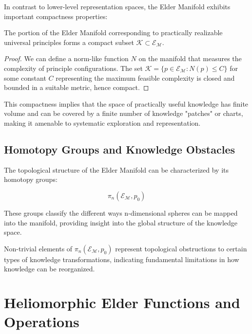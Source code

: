 In contrast to lower-level representation spaces, the Elder Manifold exhibits important compactness properties:

\begin{theorem}
The portion of the Elder Manifold corresponding to practically realizable universal principles forms a compact subset $\mathcal{K} \subset \mathcal{E}_{\mathcal{M}}$.
\end{theorem}

\begin{proof}
We can define a norm-like function $N$ on the manifold that measures the complexity of principle configurations. The set $\mathcal{K} = \{p \in \mathcal{E}_{\mathcal{M}} : N(p) \leq C\}$ for some constant $C$ representing the maximum feasible complexity is closed and bounded in a suitable metric, hence compact.
\end{proof}

This compactness implies that the space of practically useful knowledge has finite volume and can be covered by a finite number of knowledge "patches" or charts, making it amenable to systematic exploration and representation.

\subsection{Homotopy Groups and Knowledge Obstacles}

The topological structure of the Elder Manifold can be characterized by its homotopy groups:

\begin{equation}
\pi_n(\mathcal{E}_{\mathcal{M}}, p_0)
\end{equation}

These groups classify the different ways n-dimensional spheres can be mapped into the manifold, providing insight into the global structure of the knowledge space.

\begin{proposition}
Non-trivial elements of $\pi_n(\mathcal{E}_{\mathcal{M}}, p_0)$ represent topological obstructions to certain types of knowledge transformations, indicating fundamental limitations in how knowledge can be reorganized.
\end{proposition}

\section{Heliomorphic Elder Functions and Operations}

